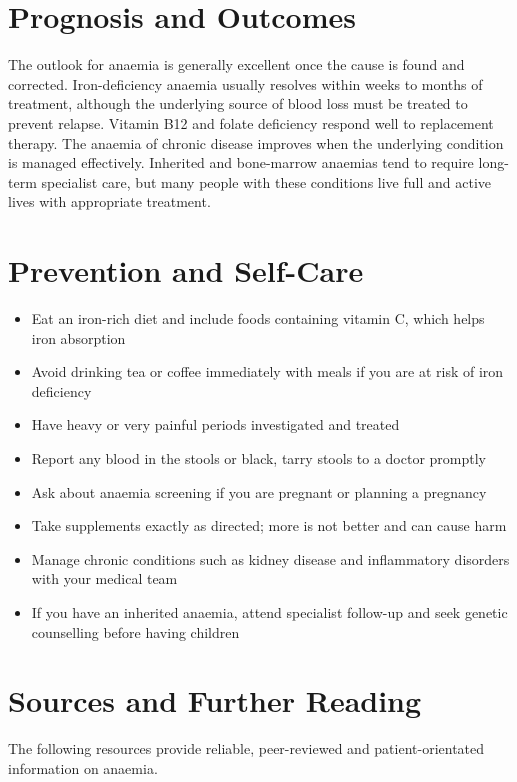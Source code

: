 \section*{Prognosis and Outcomes}
The outlook for anaemia is generally excellent once the cause is found and corrected. Iron-deficiency anaemia usually resolves within weeks to months of treatment, although the underlying source of blood loss must be treated to prevent relapse. Vitamin B12 and folate deficiency respond well to replacement therapy. The anaemia of chronic disease improves when the underlying condition is managed effectively. Inherited and bone-marrow anaemias tend to require long-term specialist care, but many people with these conditions live full and active lives with appropriate treatment.

\section*{Prevention and Self-Care}
\begin{itemize}
    \item Eat an iron-rich diet and include foods containing vitamin C, which helps iron absorption
    \item Avoid drinking tea or coffee immediately with meals if you are at risk of iron deficiency
    \item Have heavy or very painful periods investigated and treated
    \item Report any blood in the stools or black, tarry stools to a doctor promptly
    \item Ask about anaemia screening if you are pregnant or planning a pregnancy
    \item Take supplements exactly as directed; more is not better and can cause harm
    \item Manage chronic conditions such as kidney disease and inflammatory disorders with your medical team
    \item If you have an inherited anaemia, attend specialist follow-up and seek genetic counselling before having children
\end{itemize}

\section*{Sources and Further Reading}
The following resources provide reliable, peer-reviewed and patient-orientated information on anaemia.

